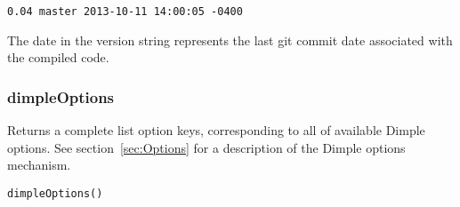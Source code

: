 \begin{lstlisting}
0.04 master 2013-10-11 14:00:05 -0400
\end{lstlisting}

The date in the version string represents the last git commit date associated with the compiled code.

\ifmatlab

\subsubsection{dimpleOptions}

Returns a complete list option keys, corresponding to all of available Dimple options.  See section~\ref{sec:Options} for a description of the Dimple options mechanism.

\begin{lstlisting}
dimpleOptions()
\end{lstlisting}



\fi

%
%
%
%
%
%
%
%
